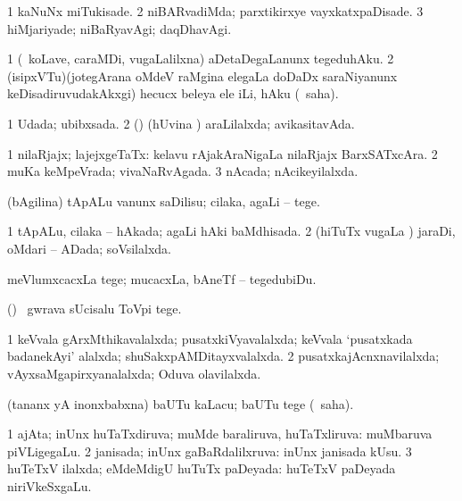 \bentry
{} 
\gl{\kirxvi}
\expl{}
\bmng
\bnum
\num{1} kaNuNx miTukisade. 
\num{2} niBARvadiMda; parxtikirxye vayxkatxpaDisade. 
\num{3} hiMjariyade; niBaRyavAgi; daqDhavAgi. 
\enum
\emng
\eentry

\bentry
{} 
\gl{\sakirx}
\expl{}
\bmng
\bnum
\num{1} (\kanmu\ koLave, caraMDi, \mo vugaLalilxna) aDetaDegaLanunx tegeduhAku. 
\num{2} (isipxVTu)(jotegArana oMdeV raMgina elegaLa doDaDx saraNiyanunx keDisadiruvudakAkxgi) hecucx beleya ele iLi, hAku (\akirx\ saha). 
\enum
\emng
\eentry

\bentry
{} 
\gl{\gu}
\expl{}
\bmng
\bnum
\num{1} Udada; ubibxsada. 
\num{2} (\pArxparx) (hUvina \vi) araLilalxda; avikasitavAda. 
\enum
\emng
\eentry

\bentry
{} 
\gl{\gu}
\expl{}
\bmng
\bnum
\num{1} nilaRjajx; lajejxgeTaTx:  kelavu rAjakAraNigaLa nilaRjajx BarxSATxcAra. 
\num{2} muKa keMpeVrada; vivaNaRvAgada. 
\num{3} nAcada; nAcikeyilalxda. 
\enum
\emng
\eentry

\bentry
{} 
\gl{\sakirx}
\expl{}
\bmng
(bAgilina) tApALu \mo vanunx saDilisu; cilaka, agaLi -- tege. 
\emng
\eentry

\bentry
{} 
\gl{\gu}
\expl{}
\bmng
\bnum
\num{1} tApALu, cilaka -- hAkada; agaLi hAki baMdhisada. 
\num{2} (hiTuTx \mo vugaLa \vi) jaraDi, oMdari -- ADada; soVsilalxda. 
\enum
\emng
\eentry

\bentry
{} 
\gl{\sakirx}
\expl{}
\bmng
meVlumxcacxLa tege; mucacxLa, bAneTf -- tegedubiDu. 
\emng

\noindent 
\gl{\akirx}
\expl{}
\bmng
(\pArxparx) \kanmu\ gwrava sUcisalu ToVpi tege. 
\emng
\eentry
 
\bentry
{} 
\gl{\gu}
\expl{}
\bmng
\bnum
\num{1} keVvala gArxMthikavalalxda; pusatxkiVyavalalxda; keVvala `pusatxkada badanekAyi' alalxda; shuSakxpAMDitayxvalalxda. 
\num{2} pusatxkajAcnxnavilalxda; vAyxsaMgapirxyanalalxda; Oduva olavilalxda. 
\enum
\emng
\eentry

\bentry
{} 
\gl{\akirx}
\expl{}
\bmng
(tananx yA inonxbabxna) baUTu kaLacu; baUTu tege (\akirx\ saha). 
\emng
\eentry

\bentry
{} 
\gl{\gu}
\expl{}
\bmng
\bnum
\num{1} ajAta; inUnx huTaTxdiruva; muMde baraliruva, huTaTxliruva:  muMbaruva piVLigegaLu. 
\num{2} janisada; inUnx gaBaRdalilxruva:  inUnx janisada kUsu. 
\num{3} huTeTxV ilalxda; eMdeMdigU huTuTx paDeyada:  huTeTxV paDeyada niriVkeSxgaLu. 
\enum
\emng
\eentry

